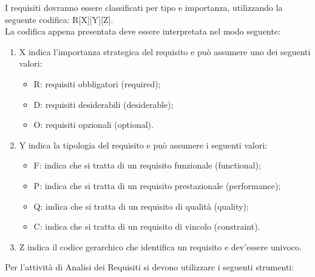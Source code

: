 				I requisiti dovranno essere classificati per tipo e importanza, utilizzando la seguente codifica: R[X][Y][Z].\\
				La codifica appena presentata deve essere interpretata nel modo seguente:
				\begin{enumerate}
					\item X indica l'importanza strategica del requisito e può assumere uno dei seguenti valori:
					\begin{itemize}
						\item R: requisiti obbligatori (required);
						\item D: requisiti desiderabili (desiderable);
						\item O: requisiti opzionali (optional).
					\end{itemize}
					\item Y indica la tipologia del requisito e può assumere i seguenti valori:
					\begin{itemize}
						\item F: indica che si tratta di un requisito funzionale (functional);
						\item P: indica che si tratta di un requisito prestazionale (performance);
						\item Q: indica che si tratta di un requisito di qualità (quality);
						\item C: indica che si tratta di un requisito di vincolo (constraint).
					\end{itemize}
					\item Z indica il codice gerarchico che identifica un requisito e dev'essere univoco.
				\end{enumerate}
			Per l'attività di Analisi dei Requisiti si devono utilizzare i seguenti strumenti:
